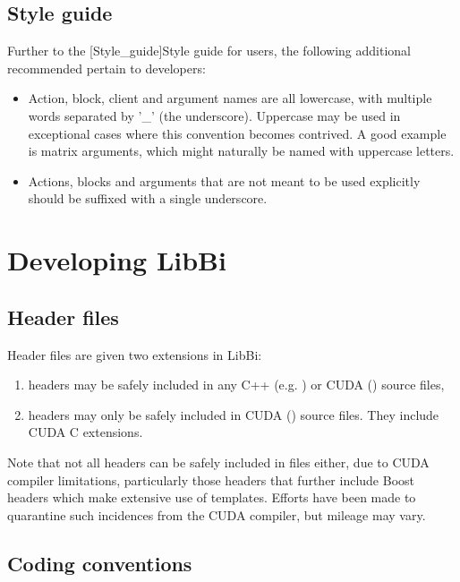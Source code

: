 \subsection{Style guide\label{Developer_style_guide}}

Further to the \hyperref[hyper][Style_guide]{Style guide} for users, the
following additional recommended pertain to developers:
\begin{itemize}
\item Action, block, client and argument names are all lowercase, with
  multiple words separated by '\_' (the underscore). Uppercase may be used in
  exceptional cases where this convention becomes contrived. A good example is
  matrix arguments, which might naturally be named with uppercase letters.
\item Actions, blocks and arguments that are not meant to be used explicitly
  should be suffixed with a single underscore.
\end{itemize}

\section{Developing LibBi}

\subsection{Header files}

Header files are given two extensions in LibBi:
\begin{enumerate}
\item {} headers may be safely included in any C++ (e.g.
) or CUDA () source files,
\item {} headers may only be safely included in CUDA ()
source files. They include CUDA C extensions.
\end{enumerate}

Note that not all  headers can be safely included in 
files either, due to CUDA compiler limitations, particularly those headers
that further include Boost headers which make extensive use of
templates. Efforts have been made to quarantine such incidences from the CUDA
compiler, but mileage may vary.

\subsection{Coding conventions}

